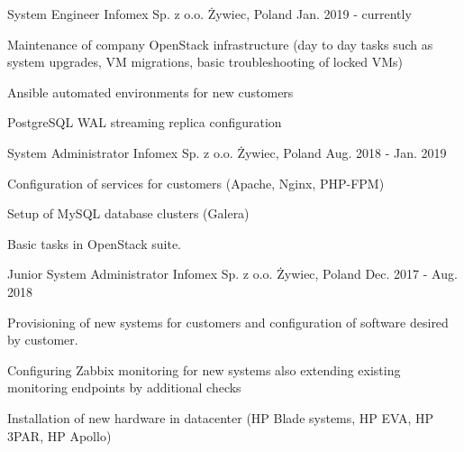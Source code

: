 

\begin{cventries}

  \cventry
    {System Engineer} %
    {Infomex Sp. z o.o.} %
    {Żywiec, Poland} %
    {Jan. 2019 - currently} %
    {
      \begin{cvitems} %
        \item {Maintenance of company OpenStack infrastructure (day to day tasks such as system upgrades, VM migrations, basic troubleshooting of locked VMs)}
        \item {Ansible automated environments for new customers}
        \item {PostgreSQL WAL streaming replica configuration}
      \end{cvitems}
    }
    

  \cventry
    {System Administrator} %
    {Infomex Sp. z o.o.} %
    {Żywiec, Poland} %
    {Aug. 2018 - Jan. 2019} %
    {
      \begin{cvitems} %
        \item {Configuration of services for customers (Apache, Nginx, PHP-FPM)}
        \item {Setup of MySQL database clusters (Galera)}
        \item {Basic tasks in OpenStack suite.}
      \end{cvitems}
    }

  \cventry
    {Junior System Administrator} %
    {Infomex Sp. z o.o.} %
    {Żywiec, Poland} %
    {Dec. 2017 - Aug. 2018} %
    {
      \begin{cvitems} %
        \item {Provisioning of new systems for customers and configuration of software desired by customer.}
        \item {Configuring Zabbix monitoring for new systems also extending existing monitoring endpoints by additional checks}
        \item {Installation of new hardware in datacenter (HP Blade systems, HP EVA, HP 3PAR, HP Apollo)}
      \end{cvitems}
    }


\end{cventries}
